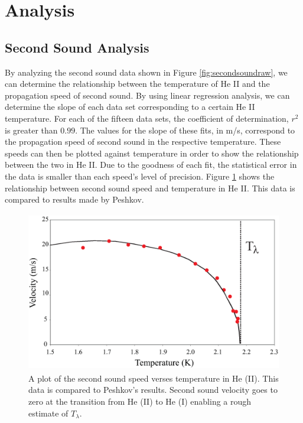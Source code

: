 
\section{Analysis}\label{analysis}
\subsection{Second Sound Analysis}\label{analysis}

By analyzing the second sound data shown in Figure \ref{fig:secondsoundraw}, we can determine the relationship between the temperature of He II and the propagation speed of second sound.  By using linear regression analysis, we can determine the slope of each data set corresponding to a certain He II temperature.  For each of the fifteen data sets, the coefficient of determination, $r^{2}$ is greater than $0.99$.  The values for the slope of these fits, in m/s, correspond to the propagation speed of second sound in the respective temperature.  These speeds can then be plotted against temperature in order to show the relationship between the two in He II.  Due to the goodness of each fit, the statistical error in the data is smaller than each speed's level of precision. Figure \ref{fig:secondsound} shows the relationship between second sound speed and temperature in He II.  This data is compared to results made by Peshkov.\cite{peshkov}

\begin{figure}[htbp]
\begin{center}
\includegraphics[height=70mm]{./figures/secondsound.eps}
\caption{\small{A plot of the second sound speed verses temperature in He (II).  This data is compared to Peshkov's results.\cite{peshkov} Second sound velocity goes to zero at the transition from He (II) to He (I) enabling a rough estimate of $T_{\lambda}$.}}
\label{fig:secondsound}
\end{center}
\end{figure}

